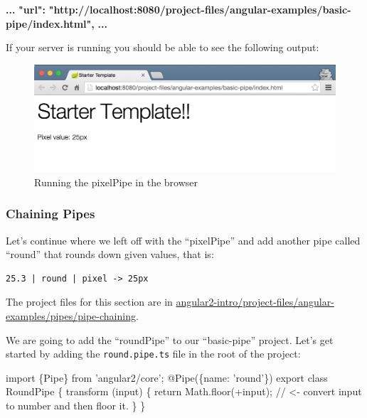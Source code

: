 \documentclass[12pt,]{article}
\newenvironment{Shaded}{}{}
\newcommand{\KeywordTok}[1]{\textcolor[rgb]{0.00,0.00,1.00}{{#1}}}
\newcommand{\CommentTok}[1]{\textcolor[rgb]{0.00,0.50,0.00}{{#1}}}
\newcommand{\FunctionTok}[1]{{#1}}
\newcommand{\ErrorTok}[1]{\textcolor[rgb]{1.00,0.00,0.00}{\textbf{{#1}}}}
\newcommand{\NormalTok}[1]{{#1}}
\begin{document}
\begin{Shaded}
\begin{Highlighting}[numbers=left,,]
\ErrorTok{...}
\ErrorTok{"url":} \ErrorTok{"http://localhost:8080/project-files/angular-examples/basic-pipe/index.html",}
\ErrorTok{...}
\end{Highlighting}
\end{Shaded}

If your server is running you should be able to see the following
output:

\begin{figure}[htbp]
\centering
\includegraphics{images/basic-pipe.png}
\caption{Running the pixelPipe in the browser}
\end{figure}

\subsubsection{Chaining Pipes}\label{chaining-pipes}

Let's continue where we left off with the ``pixelPipe'' and add another
pipe called ``round'' that rounds down given values, that is:

\begin{verbatim}
25.3 | round | pixel -> 25px
\end{verbatim}

The project files for this section are in
\href{https://github.com/aminmeyghani/angular2-intro/tree/master/project-files/angular-examples/pipes/pipe-chaining}{angular2-intro/project-files/angular-examples/pipes/pipe-chaining}.

We are going to add the ``roundPipe'' to our ``basic-pipe'' project.
Let's get started by adding the \texttt{round.pipe.ts} file in the root
of the project:

\begin{Shaded}
\begin{Highlighting}[numbers=left,,]
\KeywordTok{import \{Pipe\} from 'angular2/core';}
\FunctionTok{@Pipe}\NormalTok{(\{name: 'round'\})}
\NormalTok{export }\KeywordTok{class} \NormalTok{RoundPipe \{}
  \FunctionTok{transform} \NormalTok{(input) \{}
    \KeywordTok{return} \NormalTok{Math.}\FunctionTok{floor}\NormalTok{(+input); }\CommentTok{// <- convert input to number and then floor it.}
  \NormalTok{\}}
\NormalTok{\}}
\end{Highlighting}
\end{Shaded}
\end{document}
